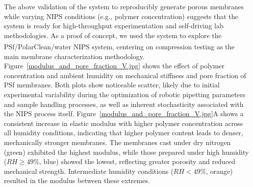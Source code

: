 \documentclass[preprint,12pt,times]{elsarticle}
\begin{document}
The above validation of the system to reproducibly generate porous membranes while varying NIPS conditions (e.g., polymer concentration) suggests that the system is ready for high-throughput experimentation and self-driving lab methodologies. As a proof of concept, we used the system to explore the PSf/PolarClean\textsuperscript{\textregistered}/water NIPS system, centering on compression testing as the main membrane characterization methodology. Figure~\ref{modulus_and_pore_fraction_V.jpg} shows the effect of polymer concentration and ambient humidity on mechanical stiffness and pore fraction of PSf membranes. Both plots show noticeable scatter, likely due to initial experimental variability during the optimization of robotic pipetting parameters and sample handling processes, as well as inherent stochasticity associated with the NIPS process itself. Figure~\ref{modulus_and_pore_fraction_V.jpg}A shows a consistent increase in elastic modulus with higher polymer concentration across all humidity conditions, indicating that higher polymer content leads to denser, mechanically stronger membranes. The membranes cast under dry nitrogen (green) exhibited the highest modulus, while those prepared under high humidity ($RH \geq 49\%$, blue) showed the lowest, reflecting greater porosity and reduced mechanical strength. Intermediate humidity conditions ($RH < 49\%$, orange) resulted in the modulus between these extremes. 
\end{document}
